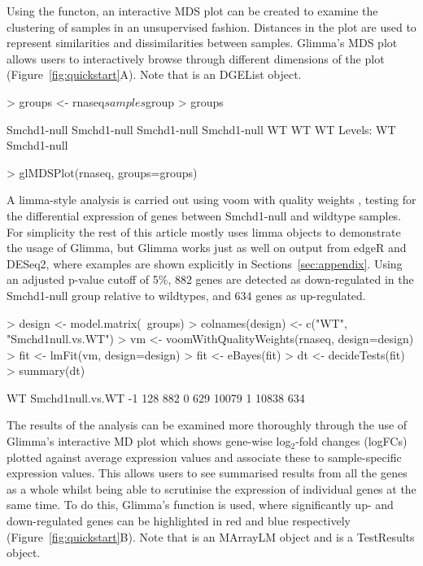 \documentclass{article}
\newcommand{\Rfun}[1]{\textcolor{VioletRed}{{\sf{#1}}}}
\begin{document}
Using the \Rfun{glMDSPlot} functon, an interactive MDS plot can be created to examine the clustering of samples in an unsupervised fashion. Distances in the plot are used to represent similarities and dissimilarities between samples. Glimma's MDS plot allows users to interactively browse through different dimensions of the plot (Figure~\ref{fig:quickstart}A). Note that {} is an {\sf DGEList} object.
\begin{Schunk}
\begin{Sinput}
> groups <- rnaseq$samples$group
> groups
\end{Sinput}
\begin{Soutput}
[1] Smchd1-null Smchd1-null Smchd1-null Smchd1-null WT          WT          WT         
Levels: WT Smchd1-null
\end{Soutput}
\begin{Sinput}
> glMDSPlot(rnaseq, groups=groups)
\end{Sinput}
\end{Schunk}

A limma-style analysis is carried out using voom with quality weights \cite{voom, voomqwts}, testing for the differential expression of genes between Smchd1-null and wildtype samples. For simplicity the rest of this article mostly uses limma objects to demonstrate the usage of Glimma, but Glimma works just as well on output from edgeR and DESeq2, where examples are shown explicitly in Sections~\ref{sec:appendix}. Using an adjusted p-value cutoff of 5\%, 882 genes are detected as down-regulated in the Smchd1-null group relative to wildtypes, and 634 genes as up-regulated.
\begin{Schunk}
\begin{Sinput}
> design <- model.matrix(~groups)
> colnames(design) <- c("WT", "Smchd1null.vs.WT")
> vm <- voomWithQualityWeights(rnaseq, design=design)
> fit <- lmFit(vm, design=design)
> fit <- eBayes(fit)
> dt <- decideTests(fit)
> summary(dt)
\end{Sinput}
\begin{Soutput}
      WT Smchd1null.vs.WT
-1   128              882
0    629            10079
1  10838              634
\end{Soutput}
\end{Schunk}

The results of the analysis can be examined more thoroughly through the use of Glimma's interactive MD plot which shows gene-wise log$_2$-fold changes (logFCs) plotted against average expression values and associate these to sample-specific expression values. This allows users to see summarised results from all the genes as a whole whilst being able to scrutinise the expression of individual genes at the same time. To do this, Glimma's \Rfun{glMDPlot} function is used, where significantly up- and down-regulated genes can be highlighted in red and blue respectively (Figure~\ref{fig:quickstart}B). Note that {} is an {\sf MArrayLM} object and {} is a {\sf TestResults} object.
\begin{Schunk}
\end{Schunk}
\end{document}
